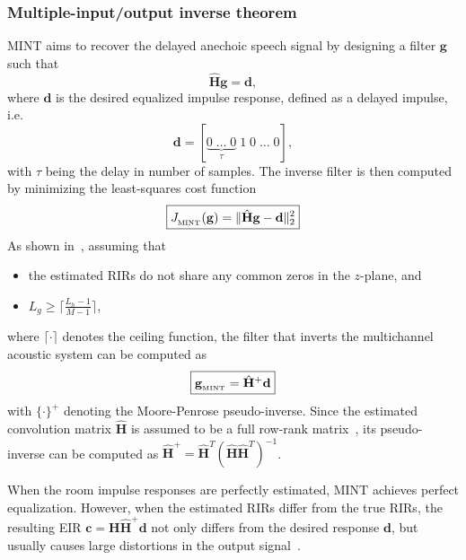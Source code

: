 \documentclass[draftcls,onecolumn,11pt]{IEEEtran}
\begin{document}
\subsubsection*{Multiple-input/output inverse theorem~\cite{Miyoshi_ITASS_1988}}
MINT aims to recover the delayed anechoic speech signal by designing a filter $\mathbf{g}$ such that
\begin{equation}
  \label{eq: minttar}
  \hat{\mathbf{H}}\mathbf{g} = \mathbf{d},
\end{equation}
where $\mathbf{d}$ is the desired equalized impulse response, defined as a delayed impulse, i.e.
\begin{equation}
  \mathbf{d} = [\underbrace{0 \; \ldots \; 0}_{\tau} \; 1 \; 0 \; \ldots \; 0 ],
\end{equation}
with $\tau$ being the delay in number of samples.
The inverse filter is then computed by minimizing the least-squares cost function
\begin{equation}
\label{eq: ls}
\boxed{J_{_{\rm MINT}}(\mathbf{g}) = \|\hat{\mathbf{H}}\mathbf{g} - \mathbf{d}\|_2^2}
\end{equation}
As shown in~\cite{Miyoshi_ITASS_1988}, assuming that
\begin{itemize}
  \item the estimated RIRs do not share any common zeros in the $z$-plane, and
  \item $L_g \geq \lceil{\frac{L_h-1}{M-1}\rceil}$,
\end{itemize}
where $\lceil{ \cdot \rceil}$ denotes the ceiling function, the filter that inverts the multichannel acoustic system can be computed as
\begin{equation}
  \label{eq: mint}
  \boxed{\mathbf{g}_{{}_{\rm MINT}} = \hat{\mathbf{H}}^+\mathbf{d}}
\end{equation}
with $\{\cdot\}^+$ denoting the Moore-Penrose pseudo-inverse.
Since the estimated convolution matrix $\hat{\mathbf{H}}$ is assumed to be a full row-rank matrix~\cite{Harikumar_ITSP_1998}, its pseudo-inverse can be computed as $\hat{\mathbf{H}}^+ = \hat{\mathbf{H}}^T(\hat{\mathbf{H}}\hat{\mathbf{H}}^T)^{-1}$.

When the room impulse responses are perfectly estimated, MINT achieves perfect equalization.
However, when the estimated RIRs differ from the true RIRs, the resulting EIR $\mathbf{c} = \mathbf{H} \hat{\mathbf{H}}^+ \mathbf{d}$ not only differs from the desired response $\mathbf{d}$, but usually causes large distortions in the output signal~\cite{Radlovic_ITSA_2000, Hikichi_EURASIP_2007}.
\end{document}
